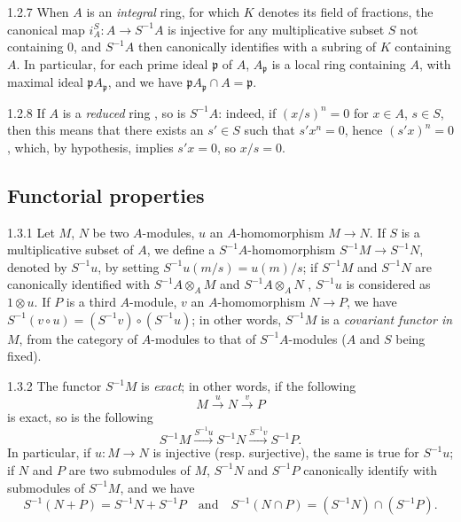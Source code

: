 \begin{env}{1.2.7}
\label{env-0.1.2.7}
When $A$ is an \emph{integral} ring, for which $K$ denotes its field of
fractions, the canonical map $i_A^S:A\to S^{-1}A$ is injective for any
multiplicative subset $S$ not containing $0$, and $S^{-1}A$ then canonically
identifies with a subring of $K$ containing $A$. In particular, for each prime
ideal $\mathfrak{p}$ of $A$, $A_\mathfrak{p}$ is a local ring containing $A$,
with maximal ideal $\mathfrak{p}A_\mathfrak{p}$, and we have
$\mathfrak{p}A_\mathfrak{p}\cap A=\mathfrak{p}$.
\end{env}

\begin{env}{1.2.8}
\label{env-0.1.2.8}
If $A$ is a \emph{reduced} ring , so is $S^{-1}A$: indeed, if
$(x/s)^n=0$ for $x\in A$, $s\in S$, then this means that there exists an
$s'\in S$ such that $s'x^n=0$, hence $(s'x)^n=0$, which, by hypothesis, implies
$s'x=0$, so $x/s=0$.
\end{env}

\subsection{Functorial properties}
\label{0-prelim-1.3}

\begin{env}{1.3.1}
\label{env-0.1.3.1}
Let $M$, $N$ be two $A$-modules, $u$ an $A$-homomorphism $M\to N$. If $S$ is a
multiplicative subset of $A$, we define a $S^{-1}A$-homomorphism
$S^{-1}M\to S^{-1}N$, denoted by $S^{-1}u$, by setting $S^{-1}u(m/s)=u(m)/s$; if
$S^{-1}M$ and $S^{-1}N$ are canonically identified with $S^{-1}A\otimes_A M$ and
$S^{-1}A\otimes_A N$ , $S^{-1}u$ is considered as $1\otimes u$.
If $P$ is a third $A$-module, $v$ an $A$-homomorphism $N\to P$, we have
$S^{-1}(v\circ u)=(S^{-1}v)\circ(S^{-1}u)$; in other words, $S^{-1}M$ is a
\emph{covariant functor in $M$}, from the category of $A$-modules to that of
$S^{-1}A$-modules ($A$ and $S$ being fixed).
\end{env}

\begin{env}{1.3.2}
\label{env-0.1.3.2}
The functor $S^{-1}M$ is \emph{exact}; in other words, if the following
\[
  M\xrightarrow{u}N\xrightarrow{v}P
\]
is exact, so is the following
\[
  S^{-1}M\xrightarrow{S^{-1}u}S^{-1}N\xrightarrow{S^{-1}v}S^{-1}P.
\]
In particular, if $u:M\to N$ is injective (resp. surjective), the same is true
for $S^{-1}u$;
if $N$ and $P$ are two submodules of $M$, $S^{-1}N$ and $S^{-1}P$ canonically
identify with submodules of $S^{-1}M$, and we have
\[
  S^{-1}(N+P)=S^{-1}N+S^{-1}P
  \quad\text{and}\quad
  S^{-1}(N\cap P)=(S^{-1}N)\cap(S^{-1}P).
\]
\end{env}

